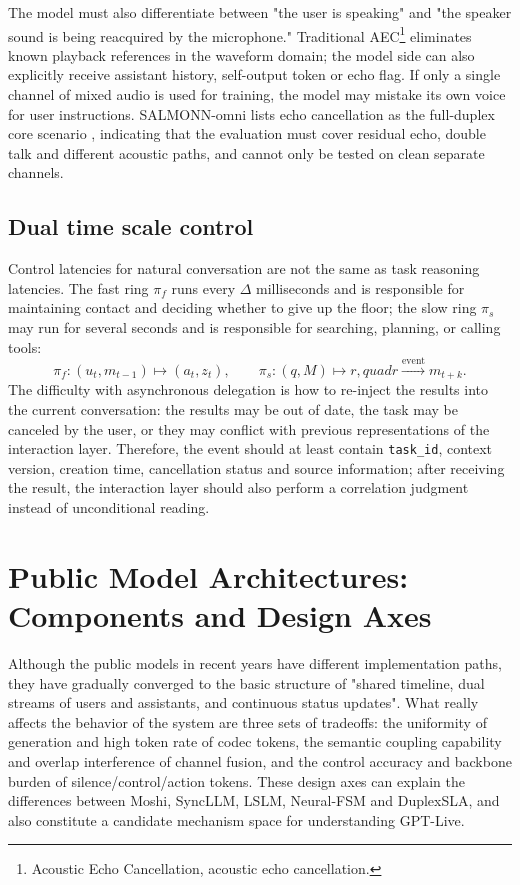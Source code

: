 \documentclass[UTF8,fontset=none,a4paper,10pt]{ctexart}
\begin{document}
The model must also differentiate between "the user is speaking" and "the speaker sound is being reacquired by the microphone." Traditional AEC\footnote{Acoustic Echo Cancellation, acoustic echo cancellation. } eliminates known playback references in the waveform domain; the model side can also explicitly receive assistant history, self-output token or echo flag. If only a single channel of mixed audio is used for training, the model may mistake its own voice for user instructions. SALMONN-omni lists echo cancellation as the full-duplex core scenario \cite{yu2025salmonnomni}, indicating that the evaluation must cover residual echo, double talk and different acoustic paths, and cannot only be tested on clean separate channels.

\subsection{Dual time scale control}

Control latencies for natural conversation are not the same as task reasoning latencies. The fast ring $\pi_f$ runs every $\Delta$ milliseconds and is responsible for maintaining contact and deciding whether to give up the floor; the slow ring $\pi_s$ may run for several seconds and is responsible for searching, planning, or calling tools:
\begin{equation}
\pi_f:(u_t,m_{t-1})\mapsto(a_t,z_t),\qquad
\pi_s:(q,M)\mapsto r,quad r\xrightarrow{\mathrm{event}}m_{t+k}.
\end{equation}
The difficulty with asynchronous delegation is how to re-inject the results into the current conversation: the results may be out of date, the task may be canceled by the user, or they may conflict with previous representations of the interaction layer. Therefore, the event should at least contain \texttt{task\_id}, context version, creation time, cancellation status and source information; after receiving the result, the interaction layer should also perform a correlation judgment instead of unconditional reading.

\section{Public Model Architectures: Components and Design Axes}

Although the public models in recent years have different implementation paths, they have gradually converged to the basic structure of "shared timeline, dual streams of users and assistants, and continuous status updates". What really affects the behavior of the system are three sets of tradeoffs: the uniformity of generation and high token rate of codec tokens, the semantic coupling capability and overlap interference of channel fusion, and the control accuracy and backbone burden of silence/control/action tokens. These design axes can explain the differences between Moshi, SyncLLM, LSLM, Neural-FSM and DuplexSLA, and also constitute a candidate mechanism space for understanding GPT-Live.
\end{document}
